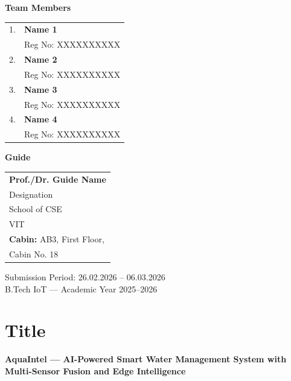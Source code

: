 \documentclass[12pt,a4paper]{article}
\begin{document}
\begin{titlepage}
    \begin{minipage}[t]{0.45\textwidth}
        \centering
        {\large\textbf{Team Members}}\\[0.4cm]
        \begin{tabular}{ll}
            1. & \textbf{Name 1} \\
               & Reg No: XXXXXXXXXX \\[0.3cm]
            2. & \textbf{Name 2} \\
               & Reg No: XXXXXXXXXX \\[0.3cm]
            3. & \textbf{Name 3} \\
               & Reg No: XXXXXXXXXX \\[0.3cm]
            4. & \textbf{Name 4} \\
               & Reg No: XXXXXXXXXX \\
        \end{tabular}
    \end{minipage}
    \hfill
    \begin{minipage}[t]{0.45\textwidth}
        \centering
        {\large\textbf{Guide}}\\[0.4cm]
        \begin{tabular}{l}
            \textbf{Prof./Dr. Guide Name} \\
            Designation \\
            School of CSE \\
            VIT \\[0.5cm]
            \textbf{Cabin:} AB3, First Floor, \\
            Cabin No. 18
        \end{tabular}
    \end{minipage}

    \vfill

    {\large Submission Period: 26.02.2026 -- 06.03.2026}\\[0.2cm]
    {\normalsize B.Tech IoT — Academic Year 2025--2026}

\end{titlepage}


\section{Title}

\textbf{AquaIntel — AI-Powered Smart Water Management System with Multi-Sensor Fusion and Edge Intelligence}
\end{document}
